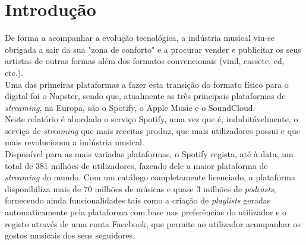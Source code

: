  

	

	

	

	

	
	


	\renewcommand{\contentsname}{Índice}
	\tableofcontents
	\listoffigures
	\listoftables


\pagestyle{fancy}
\fancyhf{}
\rhead{\titulo}
\cfoot{\thepage}

\chapter{Introdução}
\label{introduçao}

De forma a acompanhar a evolução tecnológica, a indústria musical viu-se obrigada a sair da sua "zona de conforto" e a procurar vender e publicitar os seus artistas de outras formas além dos formatos convencionais (vinil, cassete, cd, etc.).\\
	Uma das primeiras plataformas a fazer esta transição do formato físico para o digital foi o Napster, sendo que, atualmente as três principais plataformas de \textit{streaming}, na Europa, são o Spotify, o Apple Music e o SoundCloud.\\
	Neste relatório é abordado o serviço Spotify, uma vez que é, indubitávelmente, o serviço de \textit{streaming} que mais receitas produz, que mais utilizadores possui e que mais revolucionou a indústria musical.\\
	Disponível para as mais variadas plataformas, o Spotify regista, até à data, um total de 381 milhões de utilizadores, fazendo dele a maior plataforma de \textit{streaming} do mundo. Com um catálogo completamente licenciado, a plataforma disponibiliza mais de 70 milhões de músicas e quase 3 milhões de \textit{podcasts}, fornecendo ainda funcionalidades tais como a criação de \textit{playlists} geradas automaticamente pela plataforma com base nas preferências do utilizador e o registo através de uma conta Facebook, que permite ao utilizador acompanhar os gostos musicais dos seus seguidores.\\

